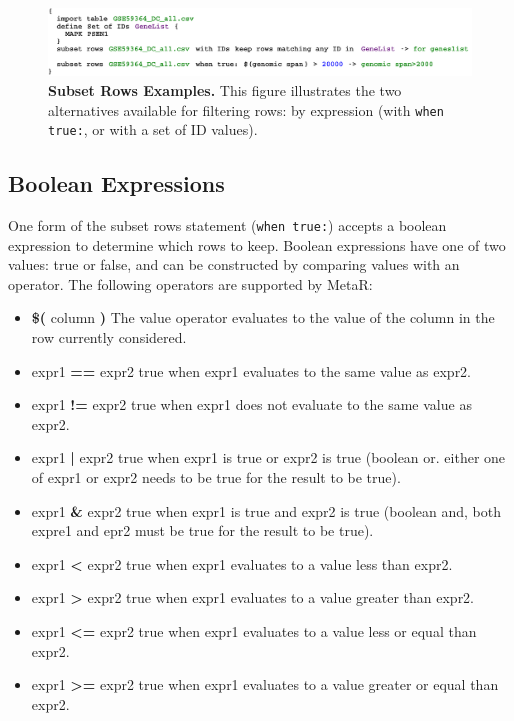 \begin{figure}[h!tbp]
  \centering
  \includegraphics[width=\figWidthWide]{figures/ExampleSubsetRows.pdf}
\caption[Subset Rows Examples.]{\textbf{Subset Rows Examples.} This figure illustrates the two alternatives available for filtering rows: by expression (with \texttt{when true:}, or with a set of ID values).}
\label{fig:ExampleSubsetRows}
\end{figure}

\subsection{Boolean Expressions}
One form of the subset rows statement (\texttt{when true:}) accepts a boolean expression to determine which rows to keep. Boolean expressions have one of two values: true or false, and can be constructed by comparing values with an operator. The following operators are supported by MetaR:
\begin{itemize}
 \item \textbf{\$(} column \textbf{)} The value operator evaluates to the value of the column in the row currently considered.
	\item expr1 \textbf{==} expr2 true when expr1 evaluates to the same value as expr2.
	\item expr1 \textbf{!=} expr2 true when expr1 does not evaluate to the same value as expr2.
	\item expr1 \textbf{|} expr2 true when expr1 is true or expr2 is true (boolean or. either one of expr1 or expr2 needs to be true for the result to be true).
    \item expr1 \textbf{\&} expr2 true when expr1 is true and expr2 is true (boolean and, both expre1 and epr2 must be true for the result to be true).
    \item expr1 \textbf{<} expr2 true when expr1 evaluates to a value less than expr2.  
    \item expr1 \textbf{>} expr2 true when expr1 evaluates to a value greater than expr2.  
   \item expr1 \textbf{<=} expr2 true when expr1 evaluates to a value less or equal than expr2.  
    \item expr1 \textbf{>=} expr2 true when expr1 evaluates to a value greater or equal than expr2.  
\end{itemize}

